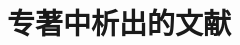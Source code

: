 \section{专著中析出的文献}

\numerical

\nocite{swgwj, bsn, wxj, gjbzjxxflbmyjs, ss, lml, buseck, fourney}


